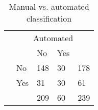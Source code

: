 \begin{table}
\begin{small}
\begin{threeparttable}
\caption{{\normalsize Manual vs. automated classification}}
\begin{tabular}{ll|ll|l}
& \multicolumn{4}{c}{Automated} \tabularnewline[0.1cm]
& & No & Yes &   \tabularnewline
\cline{2-5}
\parbox[t]{2mm}{} & No & 148 & 30 & 178 \tabularnewline
& Yes & 31 & 30 & 61 \tabularnewline
{}
&  & 209 & 60 & 239 \tabularnewline
\end{tabular}
\end{threeparttable}
\end{small}
\end{table}
